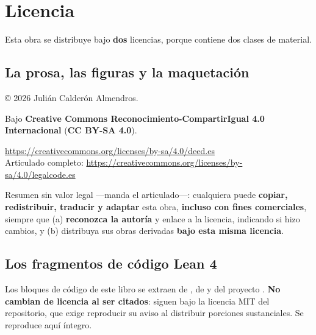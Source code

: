 \chapter{Licencia}
\label{ap:licencia}

Esta obra se distribuye bajo \textbf{dos} licencias, porque contiene dos clases de material.

\section{La prosa, las figuras y la maquetación}

\noindent\copyright{} 2026 Julián Calderón Almendros.

\medskip
\noindent Bajo \textbf{Creative Commons Reconocimiento-CompartirIgual 4.0 Internacional}
(\textbf{CC BY-SA 4.0}).

\begin{center}\small
\url{https://creativecommons.org/licenses/by-sa/4.0/deed.es}\\
Articulado completo: \url{https://creativecommons.org/licenses/by-sa/4.0/legalcode.es}
\end{center}

\noindent Resumen sin valor legal —manda el articulado—: cualquiera puede \textbf{copiar,
redistribuir, traducir y adaptar} esta obra, \textbf{incluso con fines comerciales}, siempre que
(a) \textbf{reconozca la autoría} y enlace a la licencia, indicando si hizo cambios, y (b) distribuya
sus obras derivadas \textbf{bajo esta misma licencia}.

\section{Los fragmentos de código Lean 4}

Los bloques de código de este libro se extraen de , de
 y del proyecto . \textbf{No cambian de licencia al ser citados}:
siguen bajo la licencia MIT del repositorio, que exige reproducir su aviso al distribuir porciones
sustanciales. Se reproduce aquí íntegro.

